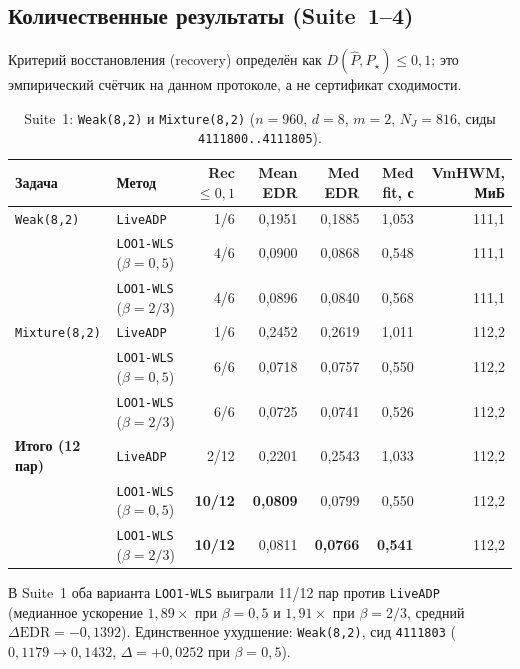 \documentclass[11pt,a4paper]{article}
\numberwithin{equation}{section}
\theoremstyle{definition}
\theoremstyle{remark}
\newcommand{\code}[1]{\nolinkurl{#1}}
\begin{document}
\subsection{Количественные результаты (Suite~1--4)}
\label{sec:bench-tables}

Критерий восстановления (recovery) определён как $D(\widehat{P}, P_\star) \le 0{,}1$;
это эмпирический счётчик на данном протоколе, а не сертификат сходимости.

\begin{table}[htbp]
\centering
\caption{Suite~1: \texttt{Weak(8,2)} и \texttt{Mixture(8,2)} ($n=960$, $d=8$, $m=2$, $N_J=816$, сиды \texttt{4111800..4111805}).}
\label{tab:suite1}
\footnotesize
\setlength{\tabcolsep}{5pt}
\begin{tabular}{@{}llrrrrr@{}}
\toprule
Задача & Метод & Rec $\le 0{,}1$ & Mean EDR & Med EDR & Med fit, с & VmHWM, МиБ \\
\midrule
\texttt{Weak(8,2)}    & \texttt{LiveADP}              & 1/6  & 0,1951 & 0,1885 & 1,053 & 111,1 \\
                      & \texttt{LOO1-WLS} ($\beta=0{,}5$) & 4/6  & 0,0900 & 0,0868 & 0,548 & 111,1 \\
                      & \texttt{LOO1-WLS} ($\beta=2/3$)   & 4/6  & 0,0896 & 0,0840 & 0,568 & 111,1 \\
\addlinespace[3pt]
\texttt{Mixture(8,2)} & \texttt{LiveADP}              & 1/6  & 0,2452 & 0,2619 & 1,011 & 112,2 \\
                      & \texttt{LOO1-WLS} ($\beta=0{,}5$) & 6/6  & 0,0718 & 0,0757 & 0,550 & 112,2 \\
                      & \texttt{LOO1-WLS} ($\beta=2/3$)   & 6/6  & 0,0725 & 0,0741 & 0,526 & 112,2 \\
\midrule
\textbf{Итого (12 пар)} & \texttt{LiveADP}            & 2/12 & 0,2201 & 0,2543 & 1,033 & 112,2 \\
                        & \texttt{LOO1-WLS} ($\beta=0{,}5$) & \textbf{10/12} & \textbf{0,0809} & 0,0799 & 0,550 & 112,2 \\
                        & \texttt{LOO1-WLS} ($\beta=2/3$)   & \textbf{10/12} & 0,0811 & \textbf{0,0766} & \textbf{0,541} & 112,2 \\
\bottomrule
\end{tabular}
\end{table}

В Suite~1 оба варианта \texttt{LOO1-WLS} выиграли 11/12 пар против \texttt{LiveADP}
(медианное ускорение $1{,}89\times$ при $\beta=0{,}5$ и $1{,}91\times$ при $\beta=2/3$,
средний $\Delta\text{EDR} = -0{,}1392$).
Единственное ухудшение: \texttt{Weak(8,2)}, сид \code{4111803} ($0{,}1179 \to 0{,}1432$, $\Delta = +0{,}0252$ при $\beta=0{,}5$).
\end{document}
